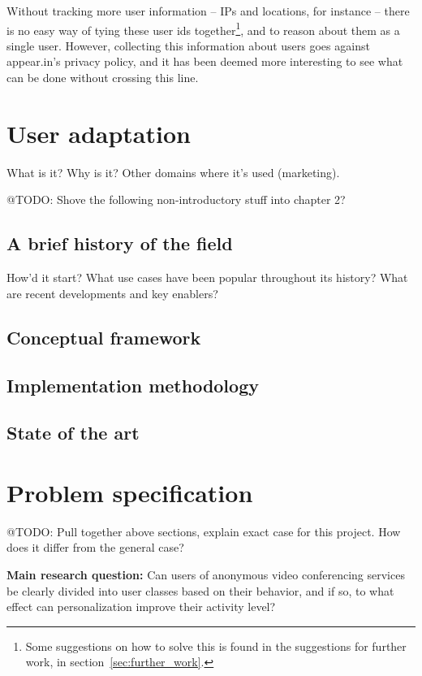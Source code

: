 Without tracking more user information -- IPs and locations, for instance -- there is no easy way of tying these user ids together\footnote{Some suggestions on how to solve this is found in the suggestions for further work, in section~\ref{sec:further_work}.}, and to reason about them as a single user. However, collecting this information about users goes against appear.in's privacy policy, and it has been deemed more interesting to see what can be done without crossing this line.

\section{User adaptation}
\label{sec:adaptation_intro}

What is it? Why is it? Other domains where it's used (marketing).

@TODO: Shove the following non-introductory stuff into chapter 2?

\subsection{A brief history of the field}

How'd it start? What use cases have been popular throughout its history? What are recent developments and key enablers?

\subsection{Conceptual framework}

\subsection{Implementation methodology}

\subsection{State of the art}

\section{Problem specification}
\label{sec:problem_specification}

@TODO: Pull together above sections, explain exact case for this project. How does it differ from the general case?

\textbf{Main research question:} Can users of anonymous video conferencing services be clearly divided into user classes based on their behavior, and if so, to what effect can personalization improve their activity level?

